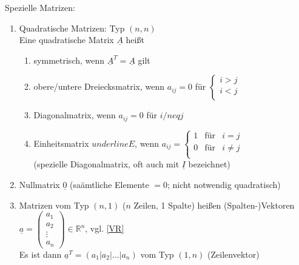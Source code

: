 \documentclass[a4paper]{scrartcl}
\begin{document}
Spezielle Matrizen:
\begin{enumerate}
\item Quadratische Matrizen: Typ $(n,n)$\\
Eine quadratische Matrix $\underline{A}$ heißt
\begin{enumerate}
\item symmetrisch, wenn $\underline{A}^T = \underline{A}$ gilt
\item obere/untere Dreiecksmatrix, wenn $a_{ij} = 0$ für $\left\{ \begin{array}{lr}
         i > j
         &   \\%
         i < j
         &  \\
                \end{array}\right.$
\item Diagonalmatrix, wenn $a_{ij}=0$ für $i/neq j$
\item Einheitsmatrix $underline{E}$, wenn $a_{ij}= \left\{ \begin{array}{rcl}
         1
         & \mbox{für}
         & i = j \\ 
        0
         & \mbox{für} 
         & i \neq j \\
                \end{array}\right.$\\
(spezielle Diagonalmatrix, oft auch mit $\underline{I}$ bezeichnet)
\end{enumerate}
\item Nullmatrix $\underline{0}$ (saämtliche Elemente $=0$; nicht notwendig quadratisch)
\item Matrizen vom Typ $(n,1)$ ($n$ Zeilen, 1 Spalte) heißen (Spalten-)Vektoren\\
$\underline{a}= \begin{pmatrix} a_1\\a_2\\ \vdots \\ a_n \end{pmatrix} \in \mathbb{R}^n$, vgl. \ref{VR}\\
Es ist dann $\underline{a}^T = (a_1 | a_2 | ... | a_n)$ vom Typ $(1,n)$ (Zeilenvektor)
\end{enumerate}
\end{document}
